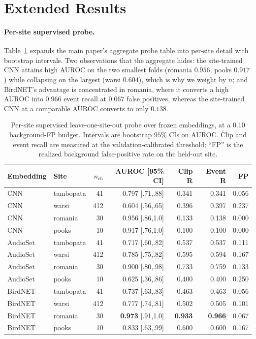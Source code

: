 \documentclass[letterpaper]{article}
\begin{document}
\section{Extended Results}

\paragraph{Per-site supervised probe.} Table~\ref{tab:supp-probe} expands the
main paper's aggregate probe table into per-site detail with bootstrap intervals.
Two observations that the aggregate hides: the site-trained CNN attains high
AUROC on the two smallest folds (romania $0.956$, pooks $0.917$) while collapsing
on the largest (warsi $0.604$), which is why we weight by $n$; and BirdNET's
advantage is concentrated in romania, where it converts a high AUROC into
$0.966$ event recall at $0.067$ false positives, whereas the site-trained CNN at
a comparable AUROC converts to only $0.138$.

\begin{table}[t]
\centering
\caption{Per-site supervised leave-one-site-out probe over frozen embeddings, at
a $0.10$ background-FP budget. Intervals are bootstrap $95\%$ CIs on AUROC.
Clip and event recall are measured at the validation-calibrated threshold;
``FP'' is the realized background false-positive rate on the held-out site.}
\label{tab:supp-probe}
\small\setlength{\tabcolsep}{3.5pt}
\begin{tabular}{llrrrrr}
\toprule
Embedding & Site & $n_{\text{ch}}$ & AUROC [95\% CI] & Clip R & Event R & FP \\
\midrule
CNN & tambopata & 41  & 0.797 [.71,.88] & 0.341 & 0.341 & 0.056 \\
CNN & warsi     & 412 & 0.604 [.56,.65] & 0.396 & 0.397 & 0.237 \\
CNN & romania   & 30  & 0.956 [.86,1.0] & 0.133 & 0.138 & 0.000 \\
CNN & pooks     & 10  & 0.917 [.76,1.0] & 0.100 & 0.100 & 0.000 \\
\midrule
AudioSet & tambopata & 41  & 0.717 [.60,.82] & 0.537 & 0.537 & 0.111 \\
AudioSet & warsi     & 412 & 0.785 [.75,.82] & 0.595 & 0.594 & 0.167 \\
AudioSet & romania   & 30  & 0.900 [.80,.98] & 0.733 & 0.759 & 0.133 \\
AudioSet & pooks     & 10  & 0.625 [.36,.86] & 0.400 & 0.400 & 0.250 \\
\midrule
BirdNET & tambopata & 41  & 0.737 [.63,.83] & 0.463 & 0.463 & 0.056 \\
BirdNET & warsi     & 412 & 0.777 [.74,.81] & 0.502 & 0.505 & 0.101 \\
BirdNET & romania   & 30  & \textbf{0.973} [.91,1.0] & \textbf{0.933} & \textbf{0.966} & 0.067 \\
BirdNET & pooks     & 10  & 0.833 [.63,.99] & 0.600 & 0.600 & 0.167 \\
\bottomrule
\end{tabular}
\end{table}
\end{document}
